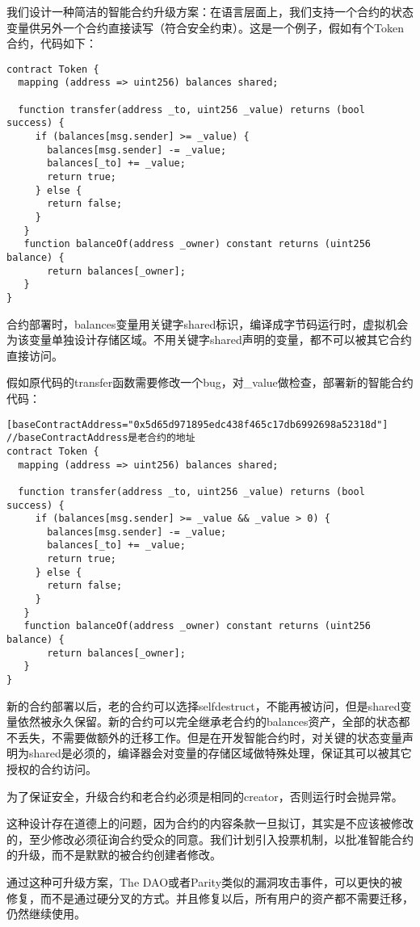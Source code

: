 我们设计一种简洁的智能合约升级方案：在语言层面上，我们支持一个合约的状态变量供另外一个合约直接读写（符合安全约束）。这是一个例子，假如有个Token合约，代码如下：
\begin{verbatim}
contract Token {
  mapping (address => uint256) balances shared;

  function transfer(address _to, uint256 _value) returns (bool success) {
     if (balances[msg.sender] >= _value) {
       balances[msg.sender] -= _value;
       balances[_to] += _value;
       return true;
     } else {
       return false;
     }
   }
   function balanceOf(address _owner) constant returns (uint256 balance) {
       return balances[_owner];
   }
}
\end{verbatim}

合约部署时，balances变量用关键字shared标识，编译成字节码运行时，虚拟机会为该变量单独设计存储区域。不用关键字shared声明的变量，都不可以被其它合约直接访问。

假如原代码的transfer函数需要修改一个bug，对\_value做检查，部署新的智能合约代码：

\begin{verbatim}
[baseContractAddress="0x5d65d971895edc438f465c17db6992698a52318d"]
//baseContractAddress是老合约的地址
contract Token {
  mapping (address => uint256) balances shared;

  function transfer(address _to, uint256 _value) returns (bool success) {
     if (balances[msg.sender] >= _value && _value > 0) {
       balances[msg.sender] -= _value;
       balances[_to] += _value;
       return true;
     } else {
       return false;
     }
   }
   function balanceOf(address _owner) constant returns (uint256 balance) {
       return balances[_owner];
   }
}
\end{verbatim}

新的合约部署以后，老的合约可以选择selfdestruct，不能再被访问，但是shared变量依然被永久保留。新的合约可以完全继承老合约的balances资产，全部的状态都不丢失，不需要做额外的迁移工作。但是在开发智能合约时，对关键的状态变量声明为shared是必须的，编译器会对变量的存储区域做特殊处理，保证其可以被其它授权的合约访问。

为了保证安全，升级合约和老合约必须是相同的creator，否则运行时会抛异常。

这种设计存在道德上的问题，因为合约的内容条款一旦拟订，其实是不应该被修改的，至少修改必须征询合约受众的同意。我们计划引入投票机制，以批准智能合约的升级，而不是默默的被合约创建者修改。

通过这种可升级方案，The DAO或者Parity类似的漏洞攻击事件，可以更快的被修复，而不是通过硬分叉的方式。并且修复以后，所有用户的资产都不需要迁移，仍然继续使用。


